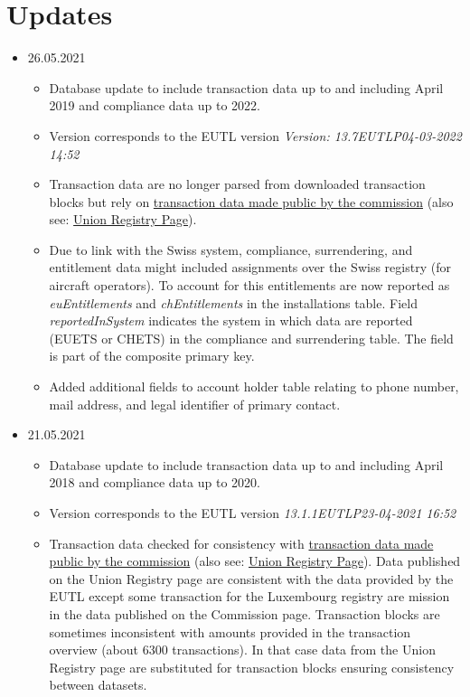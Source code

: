 \documentclass[authoryear]{elsarticle}
\begin{document}
\section*{Updates}
\begin{itemize}
	\item 26.05.2021
	\begin{itemize}
		\item Database update to include transaction data up to and including April 2019 and compliance data up to 2022. 
		\item Version corresponds to the EUTL version \emph{Version: 13.7EUTLP04-03-2022 14:52}
		\item Transaction data are no longer parsed from downloaded transaction blocks but rely on  \href{https://ec.europa.eu/clima/document/download/0cda99f1-16f6-41e7-b190-887cd71339a4_en?filename=transactions_eutl_2022.zip}{transaction data made public by the commission} (also see: \href{https://ec.europa.eu/clima/eu-action/eu-emissions-trading-system-eu-ets/union-registry_en#tab-0-1}{Union Registry Page}).
		\item Due to link with the Swiss system, compliance, surrendering, and entitlement data might included assignments over the Swiss registry (for aircraft operators). To account for this entitlements are now reported as \emph{euEntitlements} and \emph{chEntitlements} in the installations table. Field \emph{reportedInSystem} indicates the system in which data are reported (EUETS or CHETS) in the compliance and surrendering table. The field is part of the composite primary key. 
		\item Added additional fields to account holder table relating to phone number, mail address, and legal identifier of primary contact.
	\end{itemize}	
	\item 21.05.2021
		\begin{itemize}
			\item Database update to include transaction data up to and including April 2018 and compliance data up to 2020. 
			\item Version corresponds to the EUTL version \emph{13.1.1EUTLP23-04-2021 16:52}
			\item Transaction data checked for consistency with \href{https://ec.europa.eu/clima/sites/default/files/ets/registry/docs/transactions_eutl_2021.zip}{transaction data made public by the commission} (also see: \href{https://ec.europa.eu/clima/policies/ets/registry_en#tab-0-1}{Union Registry Page}). Data published on the Union Registry page are consistent with the data provided by the EUTL except some transaction for the Luxembourg registry are mission in the data published on the Commission page. Transaction blocks are sometimes inconsistent with amounts provided in the transaction overview (about 6300 transactions). In that case data from the Union Registry page are substituted for transaction blocks ensuring consistency between datasets.  			
		\end{itemize}
\end{itemize}
\end{document}
